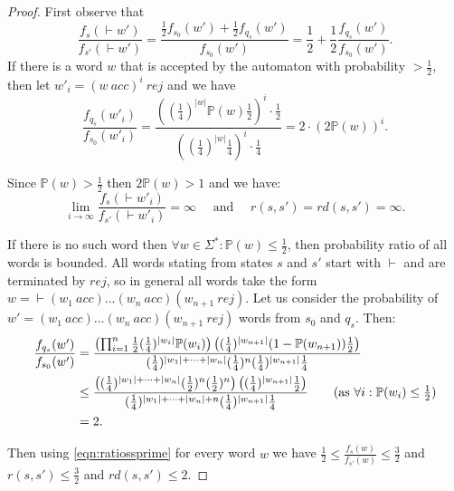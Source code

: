 \documentclass{lmcs}
\theoremstyle{plain}
\theoremstyle{definition}
\theoremstyle{remark}
\newcommand\acc{\mathit{acc}}
\newcommand\rej{\mathit{rej}}
\newcommand\pbra[1]{\left( #1 \right)}
\newcommand\pr{\mathbb{P}}
\newcommand\tvra{\mathit{r}}
\newcommand\tvrs{\mathit{rd}}
\renewcommand\nu{f}
\begin{document}
\begin{proof}

First observe that
\begin{equation} \label{eqn:ratiossprime}
\frac{\nu_s({\vdash} w')}{\nu_{s'}({\vdash} w')} =\frac{\frac{1}{2}\nu_{s_0}(w') + \frac{1}{2}\nu_{q_s}(w')}{\nu_{s_0}(w')} = \frac{1}{2} + \frac{1}{2}\frac{\nu_{q_s}(w')}{\nu_{s_0}(w')}.
\end{equation}
If there is a word $w$ that is accepted by the automaton with probability
$>\frac{1}{2}$, then let $w'_i = (w\ \acc)^i\ \rej$ and we have
\begin{equation} \label{eqn:wordgoesunbounded}
\frac{\nu_{q_s}(w'_i)}{\nu_{s_0}(w'_i)}
= \frac{((\frac{1}{4})^{|w|}\pr(w)\frac{1}{2})^i \cdot \frac{1}{2}}{((\frac{1}{4})^{|w|}\frac{1}{4})^i\cdot \frac{1}{4}} = 2 \cdot (2 \pr(w))^i.
\end{equation}

\noindent Since $\pr(w) > \frac{1}{2}$ then $2\pr(w) > 1$ and we have:
\[
\lim_{i\to\infty}\frac{\nu_s({\vdash}w'_i)}{\nu_{s'}({\vdash}w'_i)} = \infty \quad \text{ and } \quad  \tvra(s,s') =  \tvrs(s,s') = \infty.
\]

If there is no such word then $\forall w\in\Sigma^*: \pr(w) \le \frac{1}{2}$, then probability ratio of all words is bounded. All words stating from states $s$ and $s'$ start with ${\vdash}$ and are terminated by $\rej$, so in general all words take the form $w = {\vdash}(w_1\ \acc)\dots (w_n\ \acc)(w_{n+1}\ \rej)$. Let us consider the probability of $w' = (w_1\ \acc)\dots (w_n\ \acc)(w_{n+1}\ \rej)$ words from $s_0$ and $q_s$. Then:
\begin{align}
\frac{\nu_{q_s}(w')}{\nu_{s_0}(w')} &= \frac{\pbra{\prod_{i=1}^n \frac{1}{2}(\frac{1}{4})^{|w_i|}\pr(w_i)}\pbra{(\frac{1}{4})^{|w_{n+1}|}(1-\pr(w_{n+1}))\frac{1}{2}}}{(\frac{1}{4})^{|w_1| + \dots + |w_n|}(\frac{1}{4})^n(\frac{1}{4})^{|w_{n+1}|}\frac{1}{4}}
\\& \le \frac{\pbra{(\frac{1}{4})^{|w_1| + \dots + |w_n|}(\frac{1}{2})^n(\frac{1}{2})^n}\pbra{(\frac{1}{4})^{|w_{n+1}|}\frac{1}{2}}}{(\frac{1}{4})^{|w_1| + \dots + |w_n| + n}(\frac{1}{4})^{|w_{n+1}|}\frac{1}{4}}
\tag{as $\forall i: \pr(w_i) \le \frac{1}{2}$}
\\&= 2. \label{eqn:boundedtwo}
\end{align}

Then using \cref{eqn:ratiossprime} for every word $w$ we have $\frac{1}{2} \le \frac{\nu_s(w)}{\nu_{s'}(w)} \le \frac{3}{2}$ and $\tvra(s,s')\le \frac{3}{2}$ and $\tvrs(s,s')\le 2$.
\end{proof}
\end{document}
